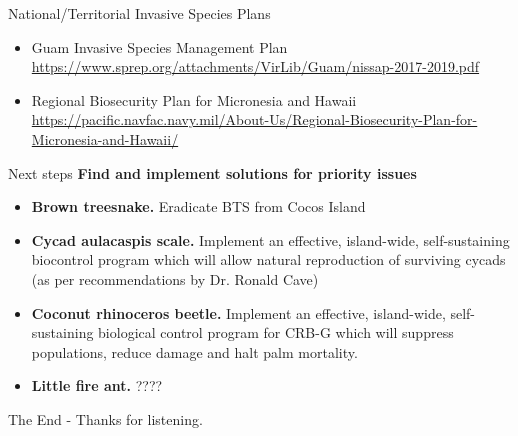 \documentclass[]{beamer}
\begin{document}
\begin{frame}{National/Territorial Invasive Species Plans}
	\begin{itemize}
		\item Guam Invasive Species Management Plan \url{https://www.sprep.org/attachments/VirLib/Guam/nissap-2017-2019.pdf}
		\item Regional Biosecurity Plan for Micronesia and Hawaii
		\url{https://pacific.navfac.navy.mil/About-Us/Regional-Biosecurity-Plan-for-Micronesia-and-Hawaii/}
	\end{itemize}	
\end{frame}

\begin{frame}{Next steps}
	\textbf{Find and implement solutions for priority issues}
	\begin{itemize}
		\item \textbf{Brown treesnake.} Eradicate BTS from Cocos Island
		\item \textbf{Cycad aulacaspis scale.} Implement an effective, island-wide, self-sustaining biocontrol program which will allow natural reproduction of surviving cycads (as per recommendations by Dr. Ronald Cave)
		\item \textbf{Coconut rhinoceros beetle.} Implement an effective, island-wide, self-sustaining biological control program for CRB-G which will suppress populations, reduce damage and halt palm mortality.
		\item \textbf{Little fire ant.} ????
	\end{itemize}

\end{frame}

\begin{frame}{The End - Thanks for listening.}
\end{frame}
\end{document}
